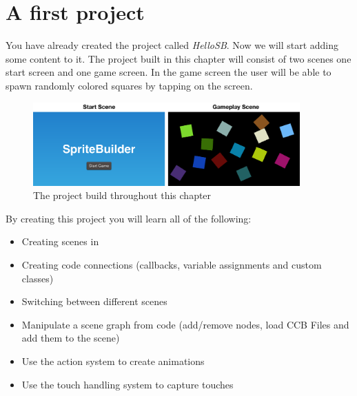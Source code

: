 \section{A first \SB{} project} 
You have already created the \SB{} project called \textit{HelloSB}. Now we will
start adding some content to it. The project built in this chapter will consist
of two scenes one start screen and one game screen. In the game screen the user will be able to spawn randomly
colored squares by tapping on the screen.
\begin{figure}[H]
		\centering
		\includegraphics[width=290pt]{images/firstproject/first_project.png}
		\caption{The project build throughout this chapter}
\end{figure}
By creating this project you will learn all of the following:
\begin{itemize}
  \item Creating scenes in \SB{}
  \item Creating code connections (callbacks, variable assignments and custom
  classes)
  \item Switching between different scenes
  \item Manipulate a scene graph from code (add/remove nodes, load CCB Files and
  add them to the scene)
  \item Use the \cocos{} action system to create animations
  \item Use the \cocos{} touch handling system to capture touches
\end{itemize}
